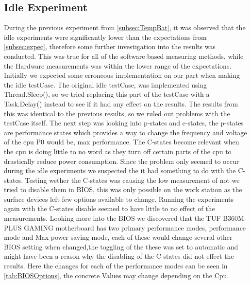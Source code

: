 \subsection{Idle Experiment}
During the previous experiment from \cref{subsec:TempBat}, it was observed that the idle experiments were significantly lower than the expectations from \cref{subsec:expec}, therefore some further investigation into the results was conducted. This was true for all of the software based measuring methods, while the Hardware measurements was within the lower range of the expectations. Initially we expected some erroneous implementation on our part when making the idle testCase. The original idle testCase, was implemented using Thread.Sleep(), so we tried replacing this part of the testCase with a Task.Delay() instead to see if it had any effect on the results. The results from this was identical to the previous results, so we ruled out problems with the testCase itself. The next step was looking into p-states and c-states\cite[]{PCStat}, the p-states are performance states which provides a way to change the frequency and voltage of the cpu P0 would be, max performance. The C-states become relevant when the cpu is doing little to no word as they turn off certain parts of the cpu to drastically reduce power consumption. Since the problem only seemed to occur during the idle experiments we suspected the it had something to do with the C-states. Testing wether the C-states was causing the low measurement of not we tried to disable them in BIOS, this was only possible on the work station as the surface devices left few options available to change. Running the experiments again with the C-states disable seemed to have little to no effect of the measurements. Looking more into the BIOS we discovered that the TUF B360M-PLUS GAMING motherboard has two primary performance modes, performance mode and Max power saving mode, each of these would change several other BIOS setting when changed,the toggling of the these was set to automatic and might have been a reason why the disabling of the C-states did not effect the results. Here the changes for each of the performance modes can be seen in \cref{tab:BIOSOptions}, the concrete Values may change depending on the Cpu.

